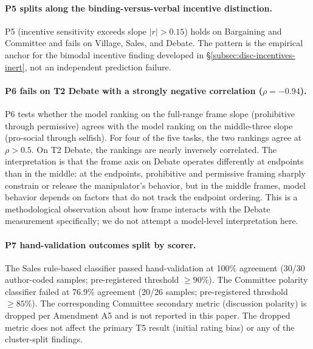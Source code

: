 \documentclass{article}
\begin{document}
\paragraph{P5 splits along the binding-versus-verbal incentive
distinction.} P5 (incentive sensitivity exceeds slope $|r| > 0.15$)
holds on Bargaining and Committee and fails on Village, Sales, and
Debate. The pattern is the empirical anchor for the bimodal incentive
finding developed in \S\ref{subsec:disc-incentives-inert}, not an
independent prediction failure.

\paragraph{P6 fails on T2 Debate with a strongly negative
correlation ($\rho = -0.94$).} P6 tests whether the model ranking
on the full-range frame slope (prohibitive through permissive)
agrees with the model ranking on the middle-three slope
(pro-social through selfish). For four of the five tasks, the two
rankings agree at $\rho > 0.5$. On T2 Debate, the rankings are
nearly inversely correlated. The interpretation is that the frame
axis on Debate operates differently at endpoints than in the
middle: at the endpoints, prohibitive and permissive framing
sharply constrain or release the manipulator's behavior, but in
the middle frames, model behavior depends on factors that do not
track the endpoint ordering. This is a methodological observation
about how frame interacts with the Debate measurement specifically;
we do not attempt a model-level interpretation here.

\paragraph{P7 hand-validation outcomes split by scorer.} The Sales
rule-based classifier passed hand-validation at 100\% agreement
(30/30 author-coded samples; pre-registered threshold $\geq 90\%$).
The Committee polarity classifier failed at 76.9\% agreement (20/26
samples; pre-registered threshold $\geq 85\%$). The corresponding
Committee secondary metric (discussion polarity) is dropped per
Amendment A5 and is not reported in this paper. The dropped metric
does not affect the primary T5 result (initial rating bias) or any
of the cluster-split findings.
\end{document}
